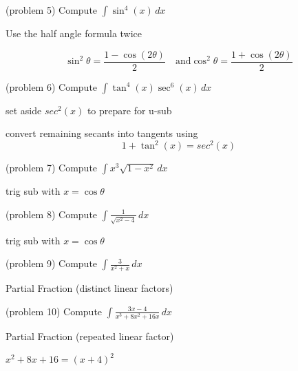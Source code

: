 \documentclass[handout]{ximera}
\begin{document}
\begin{problem}(problem 5)
Compute $\displaystyle \int \sin^4(x) \, dx$

\begin{hint}
Use the half angle formula twice

\[
\sin^2 \theta = \frac{1-\cos(2\theta)}{2} \quad \mbox{and}  \cos^2 \theta = \frac{1+\cos(2\theta)}{2}
\]
\end{hint}

\end{problem}

\begin{problem}(problem 6)
Compute $\displaystyle \int \tan^4(x) \sec^6(x) \, dx$

\begin{hint}
set aside $sec^2(x)$ to prepare for u-sub
\end{hint}

\begin{hint}
convert remaining secants into tangents using
\[
1+ \tan^2(x) = sec^2(x)
\]

\end{hint}
\end{problem}

\begin{problem}(problem 7)
Compute $\displaystyle \int x^3 \sqrt{1-x^2} \, dx$
\begin{hint}
trig sub with $x= \cos \theta$
\end{hint}

\end{problem}

\begin{problem}(problem 8)
Compute $\displaystyle \int \frac{1}{ \sqrt{x^2 - 4}} \, dx$
\begin{hint}
trig sub with $x= \cos \theta$
\end{hint}
\end{problem}


\begin{problem}(problem 9)
Compute $\displaystyle \int \frac{3}{x^2 + x} \, dx$
\begin{hint}
Partial Fraction (distinct linear factors)
\end{hint}
\end{problem}

\begin{problem}(problem 10)
Compute $\displaystyle \int \frac{3x-4}{x^3 +8x^2 +16x} \, dx$
\begin{hint}
Partial Fraction (repeated linear factor)
\end{hint}

\begin{hint}
$x^2 + 8x + 16 = (x+4)^2$
\end{hint}

\end{problem}
\end{document}
